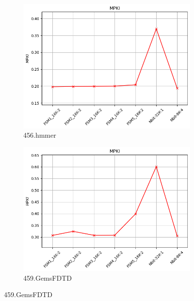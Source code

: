 \documentclass{article}
\begin{document}
\begin{figure}
    \centering
    \ContinuedFloat

    \begin{subfigure}[b]{0.45\textwidth}
        \includegraphics[width=\textwidth]{figures/5_3_c/456.hmmer.cslab_branch_preds_ref.out.png}
        \caption{456.hmmer}
        \label{fig:plot43}
    \end{subfigure}
    \hfill
    \begin{subfigure}[b]{0.45\textwidth}
        \includegraphics[width=\textwidth]{figures/5_3_c/459.GemsFDTD.cslab_branch_preds_ref.out.png}
        \caption{459.GemsFDTD}
        \label{fig:plot44}
    \end{subfigure}


\end{figure}
\end{document}
